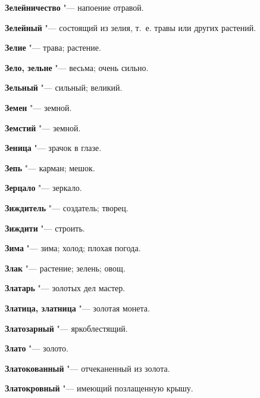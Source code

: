\begin{mymulticols}{2}
\noindent\textbf{Зелейничество} "--- напоение отравой. 




\noindent\textbf{Зелейный} "--- состоящий из зелия, т.~е. травы или других растений. 




\noindent\textbf{Зелие} "--- трава; растение. 




\noindent\textbf{Зело, зельне} "--- весьма; очень сильно. 




\noindent\textbf{Зельный} "--- сильный; великий. 




\noindent\textbf{Земен} "--- земной. 




\noindent\textbf{Земстий} "--- земной. 




\noindent\textbf{Зеница} "--- зрачок в глазе. 




\noindent\textbf{Зепь} "--- карман; мешок. 




\noindent\textbf{Зерцало} "--- зеркало. 




\noindent\textbf{Зиждитель} "--- создатель; творец. 




\noindent\textbf{Зиждити} "--- строить. 




\noindent\textbf{Зима} "--- зима; холод; плохая погода. 




\noindent\textbf{Злак} "--- растение; зелень; овощ. 




\noindent\textbf{Златарь} "--- золотых дел мастер. 




\noindent\textbf{Златица, златница} "--- золотая монета. 




\noindent\textbf{Златозарный} "--- яркоблестящий. 




\noindent\textbf{Злато} "--- золото. 




\noindent\textbf{Златокованный} "--- отчеканенный из золота. 




\noindent\textbf{Златокровный} "--- имеющий позлащенную крышу. 





\end{mymulticols}
